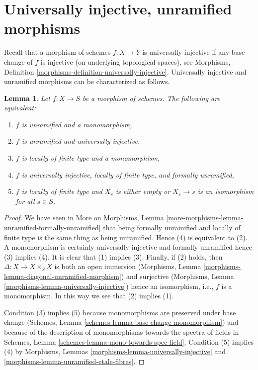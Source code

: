 \documentclass{stacks-project}
\theoremstyle{plain}
\newtheorem{lemma}[subsection]{Lemma}
\theoremstyle{definition}
\theoremstyle{remark}
\numberwithin{equation}{subsection}
\begin{document}
\section{Universally injective, unramified morphisms}
\label{section-universally-injective-unramified}

\noindent
Recall that a morphism of schemes $f : X \to Y$ is universally
injective if any base change of $f$ is injective (on underlying
topological spaces), see
Morphisms, Definition \ref{morphisms-definition-universally-injective}.
Universally injective and unramified morphisms can be
characterized as follows.

\begin{lemma}
\label{lemma-universally-injective-unramified}
Let $f : X \to S$ be a morphism of schemes.
The following are equivalent:
\begin{enumerate}
\item $f$ is unramified and a monomorphism,
\item $f$ is unramified and universally injective,
\item $f$ is locally of finite type and a monomorphism,
\item $f$ is universally injective, locally of finite type, and
formally unramified,
\item $f$ is locally of finite type and $X_s$ is either empty
or $X_s \to s$ is an isomorphism for all $s \in S$.
\end{enumerate}
\end{lemma}

\begin{proof}
We have seen in
More on Morphisms, Lemma
\ref{more-morphisms-lemma-unramified-formally-unramified}
that being formally unramified and locally of finite type is the same thing
as being unramified. Hence (4) is equivalent to (2).
A monomorphism is certainly universally injective and
formally unramified hence (3) implies (4).
It is clear that (1) implies (3). Finally, if (2) holds, then
$\Delta : X \to X \times_S X$ is both an open immersion
(Morphisms, Lemma \ref{morphisms-lemma-diagonal-unramified-morphism})
and surjective
(Morphisms, Lemma \ref{morphisms-lemma-universally-injective})
hence an isomorphism, i.e., $f$ is a monomorphism. In this way we see that
(2) implies (1).

\medskip\noindent
Condition (3) implies (5) because monomorphisms are preserved under
base change
(Schemes, Lemma \ref{schemes-lemma-base-change-monomorphism})
and because of the description of monomorphisms towards the spectra of fields
in
Schemes, Lemma \ref{schemes-lemma-mono-towards-spec-field}.
Condition (5) implies (4) by
Morphisms, Lemmas \ref{morphisms-lemma-universally-injective} and
\ref{morphisms-lemma-unramified-etale-fibres}.
\end{proof}
\end{document}
